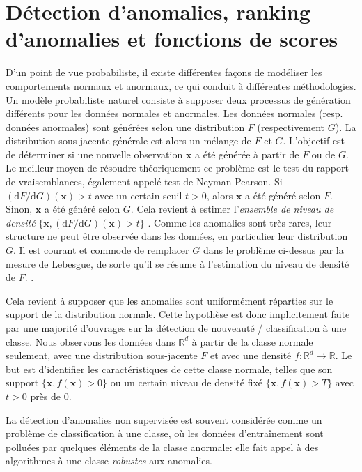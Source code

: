 \documentclass[a4paper, 12pt]{article}
\newcommand{\ud}{\mathrm{d}}
\def\mb{\mathbf}
\def\rset{\mathbb{R}}
\begin{document}
\section{Détection d'anomalies, ranking d'anomalies et fonctions de scores}
\label{resume_fr:scoring_function}
D'un point de vue probabiliste, il existe différentes façons de modéliser les comportements normaux et anormaux, ce qui conduit à différentes méthodologies. Un modèle probabiliste naturel consiste à supposer deux processus de génération différents pour les données normales et anormales. Les données normales (resp. données anormales) sont générées selon une distribution $F$ (respectivement $G$). La distribution sous-jacente générale est alors un mélange de $F$ et $G$. L'objectif est de déterminer si une nouvelle observation $ \mb x $ a été générée à partir de $ F $ ou de $ G $. Le meilleur moyen de résoudre théoriquement ce problème est le test du rapport de vraisemblances, également appelé test de Neyman-Pearson. Si $ (\ud F / \ud G) (\mb x)> t $ avec un certain seuil $ t> 0 $, alors $ \mb x $ a été généré selon $ F $. Sinon, $ \mb x $ a été généré selon $G$. Cela revient à estimer l'\emph{ensemble de niveau de densité} $ \{\mb x, (\ud F / \ud G) (\mb x)> t \} $ \citep{Scholkopf2001, Steinwart2005, Scott2006, VertVert}.
%
Comme les anomalies sont très rares, leur structure ne peut être observée dans les données, en particulier leur distribution $ G $.
%
Il est courant et commode de remplacer $ G $ dans le problème ci-dessus par la mesure de Lebesgue, de sorte qu'il se résume à l'estimation du niveau de densité de $ F $.
\citep{Scholkopf2001, Scott2006, VertVert}.

Cela revient à supposer que les anomalies sont uniformément réparties sur le support de la distribution normale. %
Cette hypothèse est donc implicitement faite par une majorité d'ouvrages sur la détection de nouveauté / classification à une classe.
%
Nous observons les données dans $ \rset ^ d $ à partir de la classe normale seulement, avec une distribution sous-jacente $ F $ et avec une densité $ f: \rset ^ d \to \rset $.
Le but est d'identifier les caractéristiques de cette classe normale, telles que son support $ \{\mb x, f (\mb x)> 0 \} $ ou un certain niveau de densité fixé $ \{\mb x, f (\mb x )> T \} $ avec $ t> 0 $ près de $ 0 $.

La détection d'anomalies non supervisée est souvent considérée comme un problème de classification à une classe, où les données d'entraînement sont polluées par quelques éléments de la classe anormale: elle fait appel à des algorithmes à une classe \emph{robustes} aux anomalies.
\end{document}
